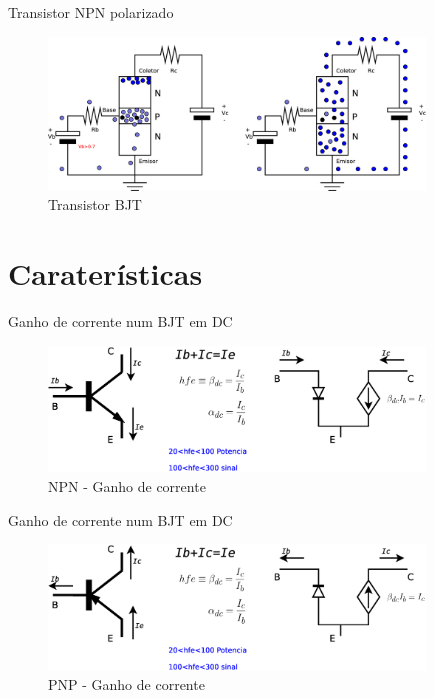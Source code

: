 \documentclass[envcountsect,dvips]{beamer}
\begin{document}

\begin{frame}{Transistor NPN polarizado }
\begin{figure}
\centering
\includegraphics[width=10cm]{images/npn.eps}
\caption{Transistor BJT}
\label{fig:npn}
\end{figure}
\end{frame}

\section{Caraterísticas}



\begin{frame}{Ganho de corrente num BJT em DC  }
\begin{figure}
\centering
\includegraphics[width=10cm]{images/ganancia.eps}
\caption{NPN - Ganho de corrente}
\label{fig:ganancia}
\end{figure}
\end{frame}

\begin{frame}{Ganho de corrente num BJT em DC  }
\begin{figure}
\centering
\includegraphics[width=10cm]{images/ganancia2.eps}
\caption{PNP - Ganho de corrente}
\label{fig:ganancia2}
\end{figure}
\end{frame}
\end{document}
